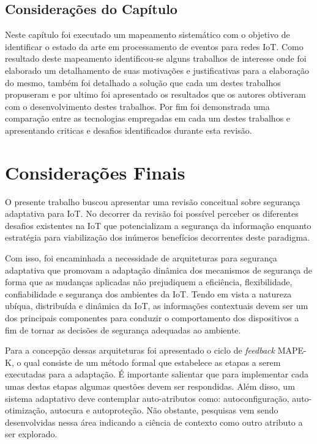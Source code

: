 \documentclass[tid,table]{texufpel} %
\newcommand {\AY} {\todo[inline, color=green]} %
\begin{document}
\section{Considerações do Capítulo}

Neste capítulo foi executado um mapeamento sistemático com o objetivo de  identificar o estado da arte em processamento de eventos para redes IoT. Como resultado deste mapeamento identificou-se alguns trabalhos de interesse onde foi elaborado um detalhamento de suas motivações e justificativas para a elaboração do mesmo, também foi detalhado a solução que cada um destes trabalhos propuseram e por ultimo foi apresentado os resultados que os autores obtiveram com o desenvolvimento destes trabalhos. Por fim foi demonstrada uma comparação entre as tecnologias empregadas em cada um destes trabalhos e apresentando criticas e desafios identificados durante esta revisão. 


\chapter{Considerações Finais}

O presente trabalho buscou apresentar uma revisão conceitual sobre segurança adaptativa para IoT. No decorrer da revisão foi possível perceber os diferentes desafios existentes na IoT que potencializam a segurança da informação enquanto estratégia para viabilização dos inúmeros benefícios decorrentes deste paradigma. 

Com isso, foi encaminhada a necessidade de arquiteturas para segurança adaptativa que promovam a adaptação dinâmica dos mecanismos de segurança de forma que as mudanças aplicadas não prejudiquem a eficiência, flexibilidade, confiabilidade e segurança dos ambientes da IoT. Tendo em vista a natureza ubíqua,
distribuída e dinâmica da IoT, as informações contextuais devem ser um dos principais componentes para conduzir o comportamento dos dispositivos a fim de tornar as decisões de segurança adequadas ao ambiente. 

Para a concepção dessas arquiteturas foi apresentado o ciclo de \textit{feedback} MAPE-K, o qual consiste de um método formal que estabelece as etapas a serem executadas para a adaptação. É importante salientar que para implementar cada umas destas etapas algumas questões devem ser respondidas. Além disso, um sistema adaptativo deve contemplar auto-atributos como: autoconfiguração, auto-otimização, autocura e autoproteção. Não obstante, pesquisas vem sendo desenvolvidas nessa área indicando a ciência de contexto como outro atributo a ser explorado.
\end{document}
